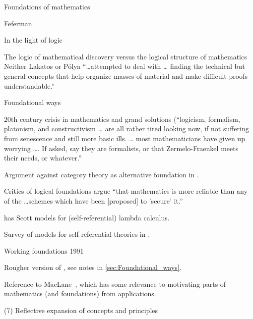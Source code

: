 \begin{plSection}{Foundations of mathematics}
\begin{plSection}{Feferman}
\begin{plSection}{In the light of logic}
\begin{plSection}{The logic of mathematical discovery 
versus the logical structure of mathematics}
Neither Lakatos or P\'{o}lya ``\ldots attempted to deal with 
\ldots
finding the technical but general concepts that 
help organize masses of material and make difficult 
proofs understandable.''

\end{plSection}%
\begin{plSection}{Foundational ways}
\label{sec:Foundational_ways}

\cite[ch~4 ``Foundational ways'']{Feferman:1998:LightOfLogic}

$20$th century crisis in mathematics and grand solutions 
(``logicism, formalism, platonism, and constructivism \ldots
are all rather tired looking now, if not suffering from
senescence and still more basic ills. \ldots
most mathematicians have given up worrying \dots .
If asked, say they are formalists, or that
Zermelo-Fraenkel meets their needs, or whatever.''

Argument against category theory as alternative 
foundation in \cite{Feferman:1977:CategoricalFoundations}.

Critics of logical foundations argue ``that mathematics
is more reliable than any of the \ldots schemes which have been
[proposed] to 'secure' it.''

\cite[ch~4, p~99]{Feferman:1998:LightOfLogic} has
Scott models for (self-referential) lambda 
calculus.~\cite{Scott:1972:ContinuousLattices,
Scott:1976:DataTypesAsLattices}

Survey of models for self-referential theories in 
\cite{Feferman:1984:TypeFreeTheoriesI}.

\end{plSection}%
\begin{plSection}{Working foundations 1991}
\label{sec:Working_foundations_1991}

\cite[ch~5 ``Working foundations 1991'']{Feferman:1998:LightOfLogic}

Rougher version of \cite[ch~4]{Feferman:1998:LightOfLogic},
see notes in \cref{sec:Foundational_ways}.

Reference to MacLane~\cite{MacLane:1981:MathModels},
which has some relevance to motivating
parts of mathematics (and foundations)
from applications.

\end{plSection}%
\begin{plSection}{(7) Reflective expansion of concepts and principles}


\end{plSection}
\end{plSection}
\end{plSection}
\end{plSection}
